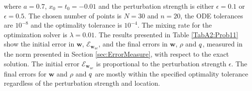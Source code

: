 where $a = 0.7$, $x_0 = t_0 = -0.01$ and the perturbation strength is either $\epsilon = 0.1$ or $\epsilon = 0.5$.
The chosen number of points is $N =30$ and $n=20$, the ODE tolerances are $10^{-8}$ and the optimality tolerance is $10^{-4}$. The mixing rate for the optimization solver is $\lambda = 0.01$.
The results presented in Table \ref{TabA2:Prob11} show the initial error in $\mathbf{w}$, $\mathcal{E}_{\mathbf{w}_{uc}}$, and the final errors in $\mathbf{w}$, $\rho$ and $q$, measured in the norm presented in Section \ref{sec:ErrorMeasure}, with respect to the exact solution. The initial error $\mathcal{E}_{\mathbf{w}_{uc}}$ is proportional to the perturbation strength $\epsilon$. The final errors for $\mathbf{w}$ and $\rho$ and $q$ are mostly within the specified optimality tolerance regardless of the perturbation strength and location. 

 \label{TabA2:Prob11}
